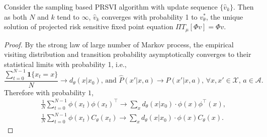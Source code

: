 \begin{lemma}\label{lem:SLLN_V}
Consider the sampling based PRSVI algorithm with update sequence $\{\widehat{v}_k\}$. Then as both $N$ and $k$ tend to $\infty$, $\widehat{v}_k$ converges with probability 1 to $v_\theta^*$, the
unique solution of projected risk sensitive fixed point equation $\Pi T_{\mu} [\Phi v]=\Phi v$.
\end{lemma}
\begin{proof}
By the strong law of large number of Markov process, the empirical visiting distribution and transition probability asymptotically converges to their statistical limits with probability 1, i.e.,
\[
\frac{\sum_{t=0}^{N-1}\mathbf{1}\{x_t=x\}}{N}\rightarrow d_\theta(x|x_0),\,\text{and}\,\,\widehat{P}(x'|x,a)\rightarrow P(x'|x,a),\,\forall x,x'\in\mathcal X, \,a\in\mathcal A.
\]
Therefore with probability $1$,
\[
\begin{split}
&\frac{1}{N}\sum_{t=0}^{N-1} \phi(x_t)\phi(x_t)^{\top}\rightarrow \sum_{x}d_\theta(x|x_0)\cdot\phi(x)\phi^\top(x),\\
&\frac{1}{N}\sum_{t=0}^{N-1}\phi(x_t) C_\theta(x_t)\rightarrow \sum_{x}d_\theta(x|x_0)\cdot\phi(x)C_\theta(x).
\end{split}
\]


\end{proof}
